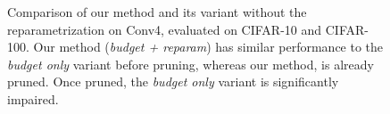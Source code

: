 \begin{figure}
  \centering
  \caption{Comparison of our method and its variant without the
    reparametrization on Conv4, evaluated on CIFAR-10 and CIFAR-100. Our method
    (\emph{budget + reparam}) has similar performance to the \emph{budget only}
    variant before pruning, whereas our method, is already pruned. Once pruned,
    the \emph{budget only} variant is significantly impaired.}
  \label{fig:chap1:budget_only_conv4}
\end{figure}

